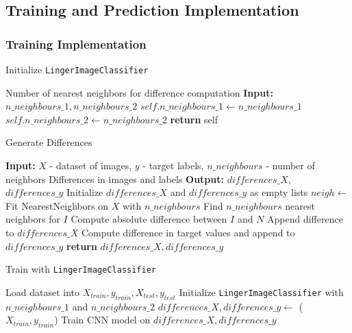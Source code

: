 \documentclass[a4paper, 12pt]{report}
\begin{document}
\subsection{Training and Prediction Implementation}
\subsubsection{Training Implementation}
\begin{algorithm}
    \caption{Initialize \texttt{LingerImageClassifier}}
    \label{alg:initialize_classifier}
    \begin{algorithmic}[1]
    \State Number of nearest neighbors for difference computation
    \State \textbf{Input:} $n\_neighbours\_1, n\_neighbours\_2$ 
        \State $self.n\_neighbours\_1 \gets n\_neighbours\_1$
        \State $self.n\_neighbours\_2 \gets n\_neighbours\_2$
        \State \textbf{return} self
    \EndProcedure
    \end{algorithmic}
\end{algorithm}
\clearpage

\begin{algorithm}
    \caption{Generate Differences}
    \label{alg:generate_image_differences_implementation}
    \begin{algorithmic}[1]
        \State \textbf{Input:} $X$ - dataset of images, $y$ - target labels, $n\_neighbours$ - number of neighbors
        \State Differences in images and labels
        \State \textbf{Output:} $differences\_X$, $differences\_y$ 
        \State Initialize $differences\_X$ and $differences\_y$ as empty lists
        \State $neigh \gets$ Fit NearestNeighbors on $X$ with $n\_neighbours$
            \State Find $n\_neighbours$ nearest neighbors for $I$
                \State Compute absolute difference between $I$ and $N$
                \State Append difference to $differences\_X$
                \State Compute difference in target values and append to $differences\_y$
            \EndFor
        \EndFor
        \State \textbf{return} $differences\_X, differences\_y$
    \EndProcedure
    \end{algorithmic}
\end{algorithm}
\clearpage

\begin{algorithm}
    \caption{Train with \texttt{LingerImageClassifier}}
    \label{alg:train_image_class_train_implementation}
    \begin{algorithmic}[1]
        \State Load dataset into $X_{train}, y_{train}, X_{test}, y_{test}$
        \State Initialize \texttt{LingerImageClassifier} with $n\_neighbours\_1$ and $n\_neighbours\_2$
        \State $differences\_X, differences\_y \gets$ ($X_{train}, y_{train}$)
        \State Train CNN model on $differences\_X, differences\_y$
        \EndProcedure
    \end{algorithmic}
\end{algorithm}
\clearpage
\end{document}
